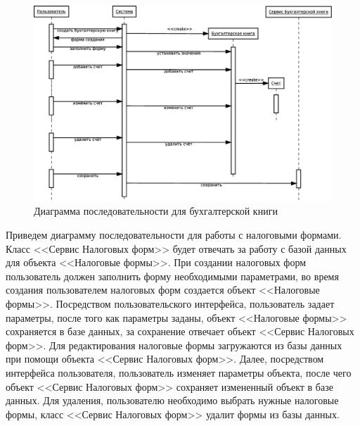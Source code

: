 \documentclass[14pt,a4paper]{reportmod}
\begin{document}
\begin{figure}
  \centering
  \includegraphics[scale=0.4]{uml/_sequence_5}
  \caption{Диаграмма последовательности для бухгалтерской книги}
  \label{pic:sequence_2}
\end{figure}

Приведем диаграмму последовательности для работы с налоговыми формами. Класс <<Сервис Налоговых форм>> будет отвечать за работу с базой данных для объекта <<Налоговые формы>>. При создании налоговых форм пользователь должен заполнить форму необходимыми параметрами, во время создания пользователем налоговых форм создается объект <<Налоговые формы>>. Посредством пользовательского интерфейса, пользователь задает параметры, после того как параметры заданы, объект <<Налоговые формы>> сохраняется в базе данных, за сохранение отвечает объект <<Сервис Налоговых форм>>. Для редактирования налоговые формы загружаются из базы данных при помощи объекта <<Сервис Налоговых форм>>. Далее, посредством интерфейса пользователя, пользователь изменяет параметры объекта, после чего объект <<Сервис Налоговых форм>> сохраняет измененный объект в базе данных. Для удаления, пользователю необходимо выбрать нужные налоговые формы, класс <<Сервис Налоговых форм>> удалит формы из базы данных.
\end{document}
